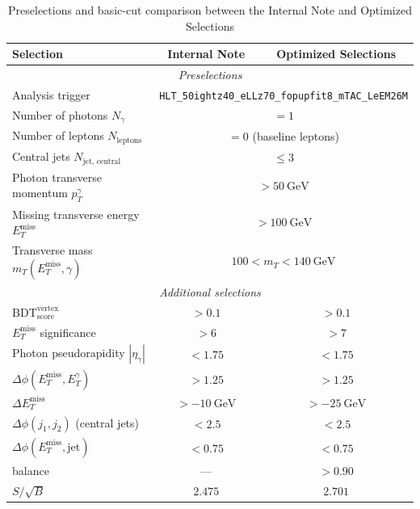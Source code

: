 \begin{table}[t]
\centering
\caption{Preselections and basic-cut comparison between the Internal Note and Optimized Selections}
\label{tab:preselection_basiccuts}
\begin{tabular}{lcc}
\hline
\textbf{Selection} & \textbf{Internal Note} & \textbf{Optimized Selections} \\
\hline
\multicolumn{3}{c}{\textit{Preselections}} \\
\hline
Analysis trigger & \multicolumn{2}{c}{\texttt{HLT\_50ight\allowbreak z40\_eLL\allowbreak z70\_fopupfit8\allowbreak \_mTAC\_LeEM26M}} \\
Number of photons $N_{\gamma}$ & \multicolumn{2}{c}{$=1$} \\
Number of leptons $N_{\text{leptons}}$ & \multicolumn{2}{c}{$=0$ (baseline leptons)} \\
Central jets $N_{\text{jet, central}}$ & \multicolumn{2}{c}{$\leq 3$} \\
Photon transverse momentum $p_T^\gamma$ & \multicolumn{2}{c}{$>50~\text{GeV}$} \\
Missing transverse energy $E_T^{\text{miss}}$ & \multicolumn{2}{c}{$>100~\text{GeV}$} \\
Transverse mass $m_T(E_T^{\text{miss}},\gamma)$ & \multicolumn{2}{c}{$100 < m_T < 140~\text{GeV}$} \\
\hline
\multicolumn{3}{c}{\textit{Additional selections}} \\
\hline
$\mathrm{BDT}^{\text{vertex}}_{\text{score}}$ & $>0.1$ & $>0.1$\\
$E_T^{\text{miss}}$ significance & $>6$ & $>7$ \\
Photon pseudorapidity $|\eta_\gamma|$ & $<1.75$ & $<1.75$ \\
$\Delta\phi(E_T^{\text{miss}}, E_T^\gamma)$ & $>1.25$ & $>1.25$ \\
$\Delta E_T^{\text{miss}}$ & $>-10~\text{GeV}$ & $>-25~\text{GeV}$ \\
$\Delta\phi(j_1,j_2)$ (central jets) & $<2.5$ & $<2.5$ \\
$\Delta\phi(E_T^{\text{miss}}, \text{jet})$ & $<0.75$ & $<0.75$ \\
balance & --- & $>0.90$ \\
\hline
$S/\sqrt{B}$ & $2.475$ & $2.701$ \\
\hline
\end{tabular}
\end{table}

